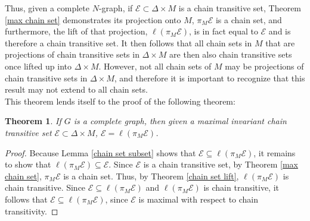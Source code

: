\documentclass[11pt]{article}
\newtheorem{thm}{Theorem}
\begin{document}
Thus, given a complete $N$-graph, if $\mathcal{E}\subset\Delta\times M$ is a chain transitive set, Theorem \ref{max chain set} demonstrates its projection onto $M$, $\pi_M\mathcal{E}$ is a chain set, and furthermore, the lift of that projection, $\ell(\pi_M\mathcal{E})$, is in fact equal to $\mathcal{E}$ and is therefore a chain transitive set.  It then follows that all chain sets in $M$ that are projections of chain transitive sets in $\Delta\times M$ are then also chain transitive sets once lifted up into $\Delta\times M$.  However, not all chain sets of $M$ may be projections of chain transitive sets in $\Delta\times M$, and therefore it is important to recognize that this result may not extend to all chain sets. \\
This theorem lends itself to the proof of the following theorem:

\begin{thm}\label{complete graph}
If $G$ is a complete graph, then given a maximal invariant chain transitive set $\mathcal{E}\subset \Delta\times M$, $\mathcal{E}=\ell(\pi_M\mathcal{E})$.
\end{thm}
\begin{proof}
Because Lemma \ref{chain set subset} shows that $\mathcal{E}\subseteq\ell(\pi_M\mathcal{E})$, it remains to show that $\ell(\pi_M\mathcal{E})\subseteq\mathcal{E}$. Since $\mathcal{E}$ is a chain transitive set, by Theorem \ref{max chain set}, $\pi_M\mathcal{E}$ is a chain set.  Thus, by Theorem \ref{chain set lift}, $\ell(\pi_M\mathcal{E})$ is chain transitive.  
Since $\mathcal{E}\subseteq \ell(\pi_M\mathcal{E})$ and $\ell(\pi_M\mathcal{E})$ is chain transitive, it follows that $\mathcal{E}\subseteq\ell(\pi_M\mathcal{E})$, since $\mathcal{E}$ is maximal with respect to chain transitivity. 
\end{proof}





\end{document}
